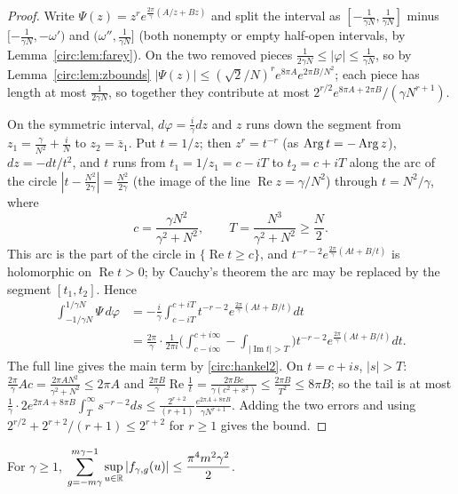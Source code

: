 \begin{proof}
Write $\Psi(z)=z^re^{\frac{2\pi}\gamma(A/z+Bz)}$ and split the interval as $[-\frac1{\gamma N},\frac1{\gamma N}]$ minus $[-\frac1{\gamma N},-\omega')$ and $(\omega'',\frac1{\gamma N}]$ (both nonempty or empty half-open intervals, by Lemma~\ref{circ:lem:farey}). On the two removed pieces $\frac1{2\gamma N}\le|\varphi|\le\frac1{\gamma N}$, so by Lemma~\ref{circ:lem:zbounds} $|\Psi(z)|\le(\sqrt2/N)^re^{8\pi A}e^{2\pi B/N^2}$; each piece has length at most $\frac1{2\gamma N}$, so together they contribute at most $2^{r/2}e^{8\pi A+2\pi B}/(\gamma N^{r+1})$.

On the symmetric interval, $d\varphi=\frac i\gamma dz$ and $z$ runs down the segment from $z_1=\frac\gamma{N^2}+\frac iN$ to $z_2=\bar z_1$. Put $t=1/z$; then $z^r=t^{-r}$ (as $\operatorname{Arg} t=-\operatorname{Arg} z$), $dz=-dt/t^2$, and $t$ runs from $t_1=1/z_1=c-iT$ to $t_2=c+iT$ along the arc of the circle $|t-\frac{N^2}{2\gamma}|=\frac{N^2}{2\gamma}$ (the image of the line $\operatorname{Re}z=\gamma/N^2$) through $t=N^2/\gamma$, where
\[
c=\frac{\gamma N^2}{\gamma^2+N^2},\qquad T=\frac{N^3}{\gamma^2+N^2}\ge\frac N2 .
\]
This arc is the part of the circle in $\{\operatorname{Re}t\ge c\}$, and $t^{-r-2}e^{\frac{2\pi}\gamma(At+B/t)}$ is holomorphic on $\operatorname{Re}t>0$; by Cauchy's theorem the arc may be replaced by the segment $[t_1,t_2]$. Hence
\[
\begin{aligned}
\int_{-1/\gamma N}^{1/\gamma N}\Psi\,d\varphi&=-\frac i\gamma\int_{c-iT}^{c+iT}t^{-r-2}e^{\frac{2\pi}\gamma(At+B/t)}dt\\
&=\frac{2\pi}\gamma\cdot\frac1{2\pi i}\Big(\int_{c-i\infty}^{c+i\infty}-\int_{|\operatorname{Im}t|>T}\Big)t^{-r-2}e^{\frac{2\pi}\gamma(At+B/t)}dt .
\end{aligned}
\]
The full line gives the main term by \eqref{circ:hankel2}. On $t=c+is$, $|s|>T$: $\frac{2\pi}\gamma Ac=\frac{2\pi AN^2}{\gamma^2+N^2}\le2\pi A$ and $\frac{2\pi B}\gamma\operatorname{Re}\frac1t=\frac{2\pi Bc}{\gamma(c^2+s^2)}\le\frac{2\pi B}{T^2}\le8\pi B$; so the tail is at most $\frac1\gamma\cdot2e^{2\pi A+8\pi B}\int_T^\infty s^{-r-2}ds\le\frac{2^{r+2}}{(r+1)}\frac{e^{2\pi A+8\pi B}}{\gamma N^{r+1}}$. Adding the two errors and using $2^{r/2}+2^{r+2}/(r+1)\le2^{r+2}$ for $r\ge1$ gives the bound.
\end{proof}

\begin{lemma}\label{circ:lem:fbound}
For $\gamma\ge1$, $\displaystyle\sum_{g=-m\gamma}^{m\gamma-1}\sup_{u\in\mathbb{R}}|f_{\gamma,g}(u)|\le\frac{\pi^4m^2\gamma^2}2$.
\end{lemma}

